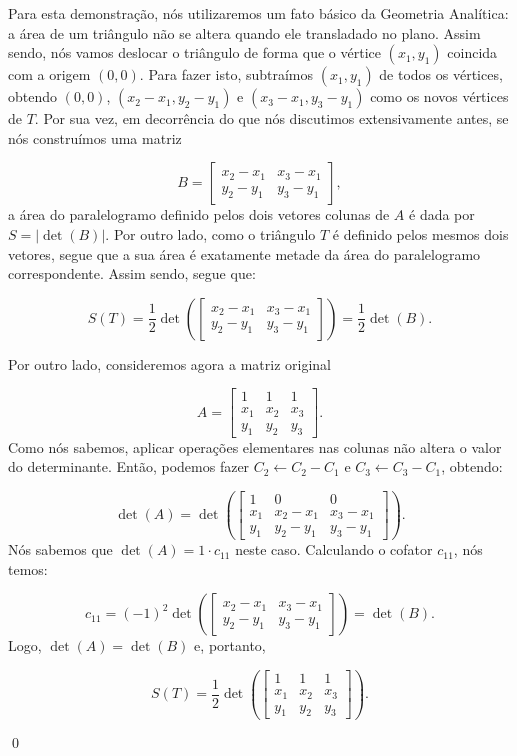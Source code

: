 \begin{Proof}
	Para esta demonstração, nós utilizaremos um fato básico da Geometria Analítica: a área de um triângulo não se altera quando ele transladado no plano. Assim sendo, nós vamos deslocar o triângulo de forma que o vértice $(x_1, y_1)$ coincida com a origem $(0, 0)$. Para fazer isto, subtraímos $(x_1, y_1)$ de todos os vértices, obtendo $(0, 0)$, $(x_2 - x_1, y_2 - y_1)$ e $(x_3 - x_1, y_3 - y_1)$ como os novos vértices de $T$. Por sua vez, em decorrência do que nós discutimos extensivamente antes, se nós construímos uma matriz
	
	$$
	B = \begin{bmatrix}
		x_2 - x_1 & x_3 - x_1 \\
		y_2 - y_1 & y_3 - y_1
	\end{bmatrix},
	$$
	a área do paralelogramo definido pelos dois vetores colunas de $A$ é dada por $S = |\det(B)|$. Por outro lado, como o triângulo $T$ é definido pelos mesmos dois vetores, segue que a sua área é exatamente metade da área do paralelogramo correspondente. Assim sendo, segue que:
	
	$$
	S(T) = \dfrac{1}{2}\det\left(\begin{bmatrix}
		x_2 - x_1 & x_3 - x_1 \\
		y_2 - y_1 & y_3 - y_1
	\end{bmatrix}\right) = \dfrac{1}{2}\det(B).
	$$
	
	Por outro lado, consideremos agora a matriz original
	
	$$
	A = \begin{bmatrix}
		1 & 1 & 1 \\
		x_1 & x_2 & x_3 \\
		y_1 & y_2 & y_3
	\end{bmatrix}.
	$$
	Como nós sabemos, aplicar operações elementares nas colunas não altera o valor do determinante. Então, podemos fazer $C_2\leftarrow C_2 - C_1$ e $C_3\leftarrow C_3 - C_1$, obtendo:
	
	$$
	\det(A) = \det\left(\begin{bmatrix}
		1 & 0 & 0 \\
		x_1 & x_2 - x_1 & x_3 - x_1 \\
		y_1 & y_2 - y_1 & y_3 - y_1
	\end{bmatrix}\right).
	$$
	Nós sabemos que $\det(A) = 1\cdot c_{11}$ neste caso. Calculando o cofator $c_{11}$, nós temos:
	
	$$
	c_{11} = (-1)^2\det\left(\begin{bmatrix}
		x_2 - x_1 & x_3 - x_1 \\
		y_2 - y_1 & y_3 - y_1
	\end{bmatrix}\right) = \det(B).
	$$
	Logo, $\det(A) = \det(B)$ e, portanto,
	
	$$
	S(T) = \dfrac{1}{2}\det\left(\begin{bmatrix}
		1 & 1 & 1 \\
		x_1 & x_2 & x_3 \\
		y_1 & y_2 & y_3
	\end{bmatrix}\right).
	$$
	
	\qed
\end{Proof}

